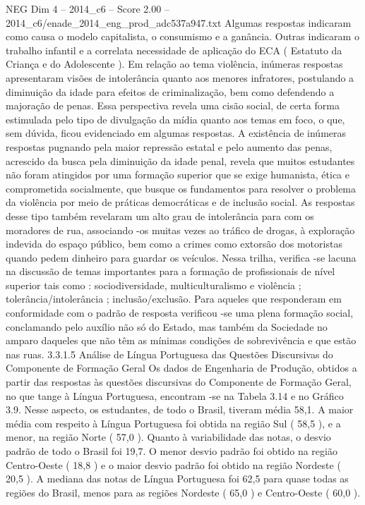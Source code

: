 \begin{textsample}{NEG Dim 4 – 2014\_c6 – Score 2.00 – 2014\_c6/enade\_2014\_eng\_prod\_adc537a947.txt}
Algumas respostas indicaram como causa o modelo capitalista, o consumismo e a ganância.
Outras indicaram o trabalho infantil e a correlata necessidade de aplicação do ECA ( Estatuto da Criança e do Adolescente ).
Em relação ao tema violência, inúmeras respostas apresentaram visões de intolerância quanto aos menores infratores, postulando a diminuição da idade para efeitos de criminalização, bem como defendendo a majoração de penas.
Essa perspectiva revela uma cisão social, de certa forma estimulada pelo tipo de divulgação da mídia quanto aos temas em foco, o que, sem dúvida, ficou evidenciado em algumas respostas.
A existência de inúmeras respostas pugnando pela maior repressão estatal e pelo aumento das penas, acrescido da busca pela diminuição da idade penal, revela que muitos estudantes não foram atingidos por uma formação superior que se exige humanista, ética e comprometida socialmente, que busque os fundamentos para resolver o problema da violência por meio de práticas democráticas e de inclusão social.
As respostas desse tipo também revelaram um alto grau de intolerância para com os moradores de rua, associando -os muitas vezes ao tráfico de drogas, à exploração indevida do espaço público, bem como a crimes como extorsão dos motoristas quando pedem dinheiro para guardar os veículos.
Nessa trilha, verifica -se lacuna na discussão de temas importantes para a formação de profissionais de nível superior tais como : sociodiversidade, multiculturalismo e violência ; tolerância/intolerância ; inclusão/exclusão.
Para aqueles que responderam em conformidade com o padrão de resposta verificou -se uma plena formação social, conclamando pelo auxílio não só do Estado, mas também da Sociedade no amparo daqueles que não têm as mínimas condições de sobrevivência e que estão nas ruas. 3.3.1.5 Análise de Língua Portuguesa das Questões Discursivas do Componente de Formação Geral Os dados de Engenharia de Produção, obtidos a partir das respostas às questões discursivas do Componente de Formação Geral, no que tange à Língua Portuguesa, encontram -se na Tabela 3.14 e no Gráfico 3.9.
Nesse aspecto, os estudantes, de todo o Brasil, tiveram média 58,1.
A maior média com respeito à Língua Portuguesa foi obtida na região Sul ( 58,5 ), e a menor, na região Norte ( 57,0 ).
Quanto à variabilidade das notas, o desvio padrão de todo o Brasil foi 19,7.
O menor desvio padrão foi obtido na região Centro-Oeste ( 18,8 ) e o maior desvio padrão foi obtido na região Nordeste ( 20,5 ).
A mediana das notas de Língua Portuguesa foi 62,5 para quase todas as regiões do Brasil, menos para as regiões Nordeste ( 65,0 ) e Centro-Oeste ( 60,0 ).

\end{textsample}
